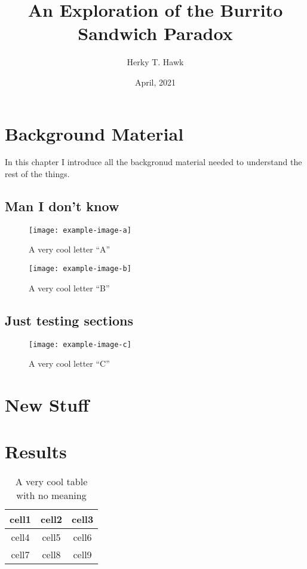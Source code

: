 \documentclass[openany, 10pt]{uithesis}
\title{An Exploration of the Burrito Sandwich Paradox}
\author{Herky T. Hawk}
\date{April, 2021}
\begin{document}
\titlepage

\frontmatter


\begin{publicAbstract}
  \lipsum[1-2]
\end{publicAbstract}

\begin{abstract}
  \lipsum[1-2]
\end{abstract}

\tableofcontents*

\listoffigures

\listoftables

\mainmatter

\chapter{Background Material}


In this chapter I introduce all the backgronud material needed to understand the
rest of the things.

\section{Man I don't know}
\begin{figure}
  \centering
  \label{fig:one}
  \caption{A very cool letter ``A''}
\texttt{[image: example-image-a]}
\end{figure}
\lipsum[1-5]
\begin{figure}
  \centering
  \label{fig:two}
  \caption{A very cool letter ``B''}
\texttt{[image: example-image-b]}
\end{figure}
\lipsum[5-10]


\section{Just testing sections}
\begin{figure}
  \centering
  \label{fig:three}
  \caption{A very cool letter ``C''}
\texttt{[image: example-image-c]}
\end{figure}
\lipsum[11-20]

\chapter{New Stuff}
\lipsum[21-40]

\chapter{Results}
\begin{table}
  \centering
  \label{table:one}
\begin{tabular}{ c c c }
 cell1 & cell2 & cell3 \\ \hline
 cell4 & cell5 & cell6 \\ \hline
 cell7 & cell8 & cell9    
\end{tabular}
  \caption{A very cool table with no meaning}
\end{table}
\lipsum[41-60]

\backmatter

\printbibliography
\end{document}
